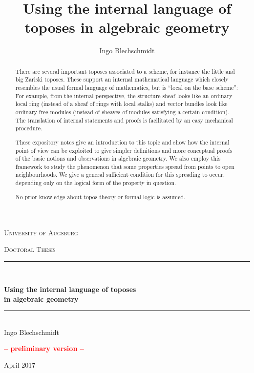 \documentclass[10pt,reqno,a4paper]{amsbook}
\title{Using the internal language of toposes in algebraic geometry}
\author{Ingo Blechschmidt}
\theoremstyle{definition}
\theoremstyle{plain}
\theoremstyle{remark}
\newcommand{\?}{\,{:}\,}
\renewcommand{\_}{\mathpunct{.}\,}
\begin{document}
\begin{abstract}
  There are several important toposes associated to a scheme, for instance the
  little and big Zariski toposes. These support an internal mathematical language
  which closely resembles the usual formal language of mathematics, but is ``local
  on the base scheme'':
  For example, from the internal perspective, the structure sheaf looks like an
  ordinary local ring (instead of a sheaf of rings with local stalks) and vector
  bundles look like ordinary free modules (instead of sheaves of modules
  satisfying a certain condition). The translation of internal statements and
  proofs is facilitated by an easy mechanical procedure.

  These expository notes give an introduction to this topic and show how the internal
  point of view can be exploited to give simpler definitions and more conceptual
  proofs of the basic notions and observations in algebraic geometry.
  We also employ this framework to study the phenomenon that some properties
  spread from points to open neighbourhoods. We give a general sufficient
  condition for this spreading to occur, depending only on the logical
  form of the property in question.

  No prior knowledge about topos theory or formal logic is assumed.
\end{abstract}

\newcommand{\HRule}{\rule{\linewidth}{.6pt}}

\begin{center}
\thispagestyle{empty}

\vspace*{.06\textheight}
{\scshape\LARGE University of Augsburg\par}\vspace{1.5cm}
\textsc{\Large Doctoral Thesis}\\[0.5cm]

\HRule \\[0.4cm]
{\huge \bfseries Using the internal language of toposes \\ in algebraic geometry\par}\vspace{0.4cm} %
\HRule \\[0.5cm]

{\large Ingo Blechschmidt}

\vfill

\vspace{4cm}

\textbf{\textcolor{red}{-- preliminary version --}}

\vfill

{\large April 2017}\\[4cm] %

\vfill
\end{center}
\end{document}
